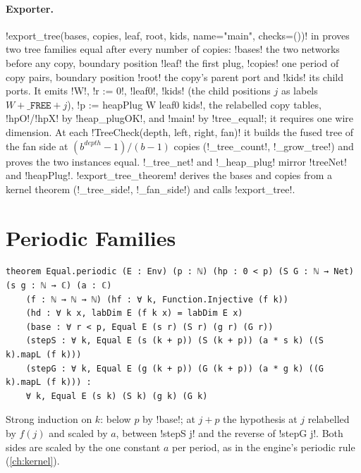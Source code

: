 {\paragraph{Exporter.} \py!export_tree(bases, copies, leaf, root, kids, name="main", checks=())! in  proves two tree families equal after every number of copies: \py!bases! the two networks before any copy, boundary position \py!leaf! the first plug, \py!copies! one period of copy pairs, boundary position \py!root! the copy's parent port and \py!kids! its child ports. It emits \lbx!W!, \lbx!r := 0!, \lbx!leaf0!, \lbx!kids! (the child positions $j$ as labels $W+\mathtt{\_FREE}+j$), \lbx!p := heapPlug W leaf0 kids!, the relabelled copy tables, \lbx!hpO!/\lbx!hpX! by \lbx!heap_plugOK!, and \lbx!main! by \lbx!tree_equal!; it requires one wire dimension. At each \py!TreeCheck(depth, left, right, fan)! it builds the fused tree of the fan side at $(b^{\mathit{depth}}-1)/(b-1)$ copies (\py!_tree_count!, \py!_grow_tree!) and proves the two instances equal. \py!_tree_net! and \py!_heap_plug! mirror \lbx!treeNet! and \lbx!heapPlug!. \py!export_tree_theorem! derives the bases and copies from a kernel theorem (\py!_tree_side!, \py!_fan_side!) and calls \py!export_tree!.

\section{Periodic Families}\label{sec:boxes-periodic}

\begin{theorem}\label{thm:boxes-periodic}
\begin{lstlisting}[style=leanbox]
theorem Equal.periodic (E : Env) (p : ℕ) (hp : 0 < p) (S G : ℕ → Net) (s g : ℕ → ℂ) (a : ℂ)
    (f : ℕ → ℕ → ℕ) (hf : ∀ k, Function.Injective (f k))
    (hd : ∀ k x, labDim E (f k x) = labDim E x)
    (base : ∀ r < p, Equal E (s r) (S r) (g r) (G r))
    (stepS : ∀ k, Equal E (s (k + p)) (S (k + p)) (a * s k) ((S k).mapL (f k)))
    (stepG : ∀ k, Equal E (g (k + p)) (G (k + p)) (a * g k) ((G k).mapL (f k))) :
    ∀ k, Equal E (s k) (S k) (g k) (G k)
\end{lstlisting}
\end{theorem}
\noindent Strong induction on $k$: below $p$ by \lbx!base!; at $j+p$ the hypothesis at $j$ relabelled by $f(j)$ and scaled by $a$, between \lbx!stepS j! and the reverse of \lbx!stepG j!. Both sides are scaled by the one constant $a$ per period, as in the engine's periodic rule (\cref{ch:kernel}).

}
